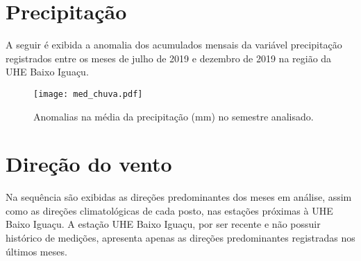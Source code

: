 \documentclass[a4paper,12pt]{article}
\begin{document}
        
        \newpage
        
        \section{Precipitação }
        \hspace{0.5cm} A seguir é exibida a anomalia dos acumulados mensais da variável precipitação registrados entre 
        os meses de julho de 2019 e dezembro de 2019 na região da UHE Baixo Iguaçu.
        
        \begin{figure}[!htb]
        \centering
        \texttt{[image: med\_chuva.pdf]}
        \caption{Anomalias na média da precipitação (mm) no semestre analisado.}
        \label{fig:figmed_chuva}
        \end{figure}
        
        \newpage
        
\section{Direção do vento}

\hspace{0.5cm} Na sequência são exibidas as direções predominantes dos meses em análise, assim como as direções
climatológicas de cada posto, nas estações próximas à UHE Baixo Iguaçu. A estação UHE Baixo Iguaçu, por
ser recente e não possuir histórico de medições, apresenta apenas as direções predominantes registradas nos 
últimos meses.
 
\end{document}

